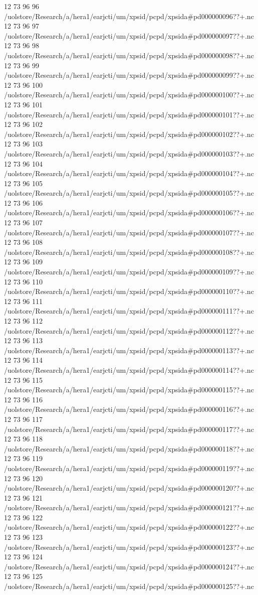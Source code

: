 12 73 96
96
/uolstore/Research/a/hera1/earjcti/um/xpsid/pcpd/xpsida#pd000000096??+.nc
12 73 96
97
/uolstore/Research/a/hera1/earjcti/um/xpsid/pcpd/xpsida#pd000000097??+.nc
12 73 96
98
/uolstore/Research/a/hera1/earjcti/um/xpsid/pcpd/xpsida#pd000000098??+.nc
12 73 96
99
/uolstore/Research/a/hera1/earjcti/um/xpsid/pcpd/xpsida#pd000000099??+.nc
12 73 96
100
/uolstore/Research/a/hera1/earjcti/um/xpsid/pcpd/xpsida#pd000000100??+.nc
12 73 96
101
/uolstore/Research/a/hera1/earjcti/um/xpsid/pcpd/xpsida#pd000000101??+.nc
12 73 96
102
/uolstore/Research/a/hera1/earjcti/um/xpsid/pcpd/xpsida#pd000000102??+.nc
12 73 96
103
/uolstore/Research/a/hera1/earjcti/um/xpsid/pcpd/xpsida#pd000000103??+.nc
12 73 96
104
/uolstore/Research/a/hera1/earjcti/um/xpsid/pcpd/xpsida#pd000000104??+.nc
12 73 96
105
/uolstore/Research/a/hera1/earjcti/um/xpsid/pcpd/xpsida#pd000000105??+.nc
12 73 96
106
/uolstore/Research/a/hera1/earjcti/um/xpsid/pcpd/xpsida#pd000000106??+.nc
12 73 96
107
/uolstore/Research/a/hera1/earjcti/um/xpsid/pcpd/xpsida#pd000000107??+.nc
12 73 96
108
/uolstore/Research/a/hera1/earjcti/um/xpsid/pcpd/xpsida#pd000000108??+.nc
12 73 96
109
/uolstore/Research/a/hera1/earjcti/um/xpsid/pcpd/xpsida#pd000000109??+.nc
12 73 96
110
/uolstore/Research/a/hera1/earjcti/um/xpsid/pcpd/xpsida#pd000000110??+.nc
12 73 96
111
/uolstore/Research/a/hera1/earjcti/um/xpsid/pcpd/xpsida#pd000000111??+.nc
12 73 96
112
/uolstore/Research/a/hera1/earjcti/um/xpsid/pcpd/xpsida#pd000000112??+.nc
12 73 96
113
/uolstore/Research/a/hera1/earjcti/um/xpsid/pcpd/xpsida#pd000000113??+.nc
12 73 96
114
/uolstore/Research/a/hera1/earjcti/um/xpsid/pcpd/xpsida#pd000000114??+.nc
12 73 96
115
/uolstore/Research/a/hera1/earjcti/um/xpsid/pcpd/xpsida#pd000000115??+.nc
12 73 96
116
/uolstore/Research/a/hera1/earjcti/um/xpsid/pcpd/xpsida#pd000000116??+.nc
12 73 96
117
/uolstore/Research/a/hera1/earjcti/um/xpsid/pcpd/xpsida#pd000000117??+.nc
12 73 96
118
/uolstore/Research/a/hera1/earjcti/um/xpsid/pcpd/xpsida#pd000000118??+.nc
12 73 96
119
/uolstore/Research/a/hera1/earjcti/um/xpsid/pcpd/xpsida#pd000000119??+.nc
12 73 96
120
/uolstore/Research/a/hera1/earjcti/um/xpsid/pcpd/xpsida#pd000000120??+.nc
12 73 96
121
/uolstore/Research/a/hera1/earjcti/um/xpsid/pcpd/xpsida#pd000000121??+.nc
12 73 96
122
/uolstore/Research/a/hera1/earjcti/um/xpsid/pcpd/xpsida#pd000000122??+.nc
12 73 96
123
/uolstore/Research/a/hera1/earjcti/um/xpsid/pcpd/xpsida#pd000000123??+.nc
12 73 96
124
/uolstore/Research/a/hera1/earjcti/um/xpsid/pcpd/xpsida#pd000000124??+.nc
12 73 96
125
/uolstore/Research/a/hera1/earjcti/um/xpsid/pcpd/xpsida#pd000000125??+.nc
